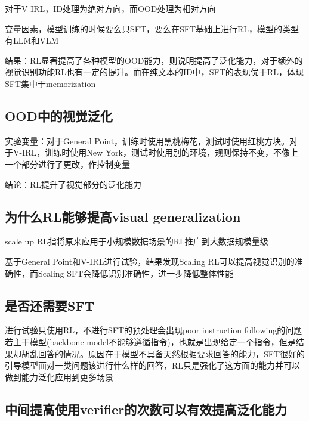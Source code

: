 \documentclass[a4paper,12pt]{article}
\begin{document}
对于V-IRL，ID处理为绝对方向，而OOD处理为相对方向

变量因素，模型训练的时候要么只SFT，要么在SFT基础上进行RL，模型的类型有LLM和VLM

结果：RL显著提高了各种模型的OOD能力，则说明提高了泛化能力，对于额外的视觉识别功能RL也有一定的提升。而在纯文本的ID中，SFT的表现优于RL，体现SFT集中于memorization

\subsection{OOD中的视觉泛化}
实验变量：对于General Point，训练时使用黑桃梅花，测试时使用红桃方块。对于V-IRL，训练时使用New York，测试时使用别的环境，规则保持不变，不像上一个部分进行了更改，作控制变量

结论：RL提升了视觉部分的泛化能力

\subsection{为什么RL能够提高visual generalization}
scale up RL指将原来应用于小规模数据场景的RL推广到大数据规模量级

基于General Point和V-IRL进行试验，结果发现Scaling RL可以提高视觉识别的准确性，而Scaling SFT会降低识别准确性，进一步降低整体性能

\subsection{是否还需要SFT}
进行试验只使用RL，不进行SFT的预处理会出现poor instruction following的问题若主干模型(backbone model不能够遵循指令)，也就是出现给定一个指令，但是结果却胡乱回答的情况。原因在于模型不具备天然根据要求回答的能力，SFT很好的引导模型面对一类问题该进行什么样的回答，RL只是强化了这方面的能力并可以做到能力泛化应用到更多场景

\subsection{中间提高使用verifier的次数可以有效提高泛化能力}
\end{document}
